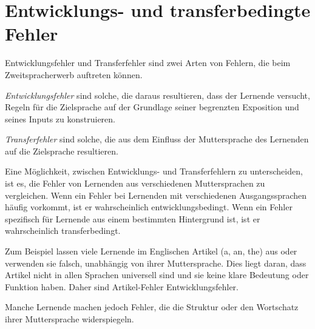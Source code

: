 \documentclass[
  letterpaper,
]{scrbook}
\begin{document}
\hypertarget{entwicklungs--und-transferbedingte-fehler}{%
\section{Entwicklungs- und transferbedingte
Fehler}\label{entwicklungs--und-transferbedingte-fehler}}

Entwicklungsfehler und Transferfehler sind zwei Arten von Fehlern, die
beim Zweitspracherwerb auftreten können.

\emph{Entwicklungsfehler} sind solche, die daraus resultieren, dass der
Lernende versucht, Regeln für die Zielsprache auf der Grundlage seiner
begrenzten Exposition und seines Inputs zu konstruieren.

\emph{Transferfehler} sind solche, die aus dem Einfluss der
Muttersprache des Lernenden auf die Zielsprache resultieren.

Eine Möglichkeit, zwischen Entwicklungs- und Transferfehlern zu
unterscheiden, ist es, die Fehler von Lernenden aus verschiedenen
Muttersprachen zu vergleichen. Wenn ein Fehler bei Lernenden mit
verschiedenen Ausgangssprachen häufig vorkommt, ist er wahrscheinlich
entwicklungsbedingt. Wenn ein Fehler spezifisch für Lernende aus einem
bestimmten Hintergrund ist, ist er wahrscheinlich transferbedingt.

\begin{tcolorbox}[enhanced jigsaw, arc=.35mm, left=2mm, bottomrule=.15mm, toprule=.15mm, colframe=quarto-callout-note-color-frame, breakable, rightrule=.15mm, opacityback=0, colback=white, leftrule=.75mm]
\begin{minipage}[t]{5.5mm}
\textcolor{quarto-callout-note-color}{\faInfo}
\end{minipage}%
\begin{minipage}[t]{\textwidth - 5.5mm}

Zum Beispiel lassen viele Lernende im Englischen Artikel (a, an, the)
aus oder verwenden sie falsch, unabhängig von ihrer Muttersprache. Dies
liegt daran, dass Artikel nicht in allen Sprachen universell sind und
sie keine klare Bedeutung oder Funktion haben. Daher sind Artikel-Fehler
Entwicklungsfehler.

\end{minipage}%
\end{tcolorbox}

Manche Lernende machen jedoch Fehler, die die Struktur oder den
Wortschatz ihrer Muttersprache widerspiegeln.
\end{document}

